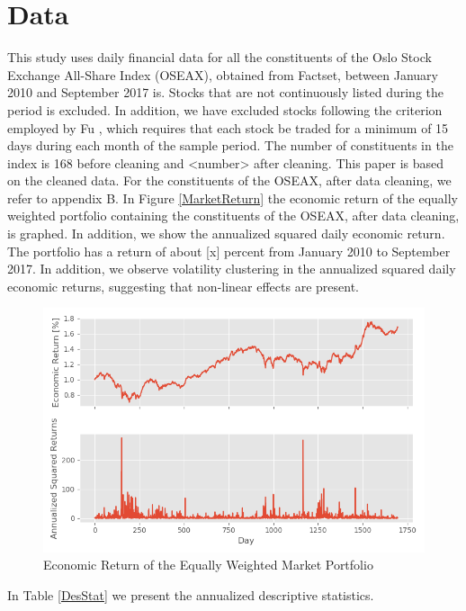 \chapter{Data}
\label{Da}

This study uses daily financial data for all the constituents of the Oslo Stock Exchange All-Share Index (OSEAX), obtained from Factset, between January 2010 and September 2017 is. Stocks that are not continuously listed during the period is excluded. In addition, we have excluded stocks following the criterion employed by Fu \cite{Fu}, which requires that each stock be traded for a minimum of 15 days during each month of the sample period. The number of constituents in the index is 168 before cleaning and <number> after cleaning. This paper is based on the cleaned data. For the constituents of the OSEAX, after data cleaning, we refer to appendix B. In Figure \ref{MarketReturn} the economic return of the equally weighted portfolio containing the constituents of the OSEAX, after data cleaning, is graphed. In addition, we show the annualized squared daily economic return. The portfolio has a return of about [x] percent from January 2010 to September 2017. In addition, we observe volatility clustering in the annualized squared daily economic returns, suggesting that non-linear effects are present.

\begin{figure}[h]
\label{MarketReturn}
    \centering
    \includegraphics[scale = 0.65]{Plot/MarketReturn.png}
    \caption{Economic Return of the Equally Weighted Market Portfolio}
    \label{Scatter regression}
\end{figure}

In Table \ref{DesStat} we present the annualized descriptive statistics.

